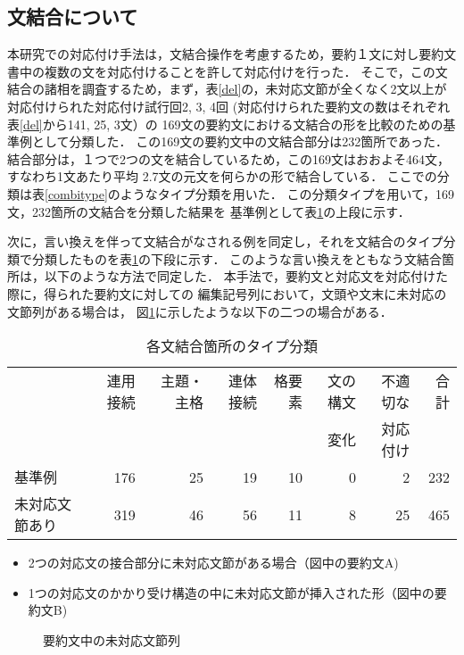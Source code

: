 \subsection{文結合について}

本研究での対応付け手法は，文結合操作を考慮するため，要約１文に対し要約文書中の複数の文を対応付けることを許して対応付けを行った．
そこで，この文結合の諸相を調査するため，まず，表\ref{del}の，未対応文節が全くなく2文以上が対応付けられた対応付け試行回2, 3, 4回
(対応付けられた要約文の数はそれぞれ表\ref{del}から141, 25, 3文）の
169文の要約文における文結合の形を比較のための基準例として分類した．
この169文の要約文中の文結合部分は232箇所であった．
結合部分は，１つで2つの文を結合しているため，この169文はおおよそ464文，すなわち1文あたり平均 2.7文の元文を何らかの形で結合している．
ここでの分類は表\ref{combitype}のようなタイプ分類を用いた．
この分類タイプを用いて，169文，232箇所の文結合を分類した結果を
基準例として表\ref{countscomb1}の上段に示す．

次に，言い換えを伴って文結合がなされる例を同定し，それを文結合のタイプ分類で分類したものを表\ref{countscomb1}の下段に示す．
このような言い換えをともなう文結合箇所は，以下のような方法で同定した．
本手法で，要約文と対応文を対応付けた際に，得られた要約文に対しての
編集記号列において，文頭や文末に未対応の文節列がある場合は，
図\ref{inter}に示したような以下の二つの場合がある．

\begin{table}
\caption{各文結合箇所のタイプ分類} 
\label{countscomb1}
\begin{center}
\small
\begin{tabular}{|l|r|r|r|r|r|r|r|}
\hline
    &連用接続&主題・主格&連体接続&格要素&文の構文&不適切な&合計\\
    &        &          &        &      &変化    &対応付け&    \\ \hline
基準例&176 & 25 & 19 & 10 & 0 & 2 & 232 \\
未対応文節あり&319 & 46 & 56 & 11 & 8 &25 & 465 \\ \hline
\end{tabular}
\end{center}
\end{table}

\begin{itemize}
\item 2つの対応文の接合部分に未対応文節がある場合（図中の要約文A)
\item 1つの対応文のかかり受け構造の中に未対応文節が挿入された形（図中の要約文B)
\end{itemize}
\begin{figure}[htbp]
\begin{center}
\caption{要約文中の未対応文節列}
\label{inter}
\end{center}
\end{figure}

